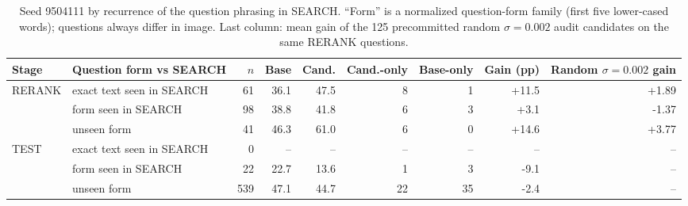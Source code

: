 \begin{table}[t]
\centering
\small
\begin{adjustbox}{max width=\linewidth}
\begin{tabular}{llrrrrrrr}
\toprule
Stage & Question form vs SEARCH & $n$ & Base & Cand. & Cand.-only & Base-only & Gain (pp) & Random $\sigma{=}0.002$ gain \\
\midrule
RERANK & exact text seen in SEARCH & 61 & 36.1 & 47.5 & 8 & 1 & +11.5 & +1.89 \\
 & form seen in SEARCH & 98 & 38.8 & 41.8 & 6 & 3 & +3.1 & -1.37 \\
 & unseen form & 41 & 46.3 & 61.0 & 6 & 0 & +14.6 & +3.77 \\
\midrule
TEST & exact text seen in SEARCH & 0 & -- & -- & -- & -- & -- & -- \\
 & form seen in SEARCH & 22 & 22.7 & 13.6 & 1 & 3 & -9.1 & -- \\
 & unseen form & 539 & 47.1 & 44.7 & 22 & 35 & -2.4 & -- \\
\bottomrule
\end{tabular}
\end{adjustbox}
\caption{Seed 9504111 by recurrence of the question phrasing in SEARCH. ``Form'' is a normalized question-form family (first five lower-cased words); questions always differ in image. Last column: mean gain of the 125 precommitted random $\sigma{=}0.002$ audit candidates on the same RERANK questions.}
\label{tab:forms}
\end{table}
